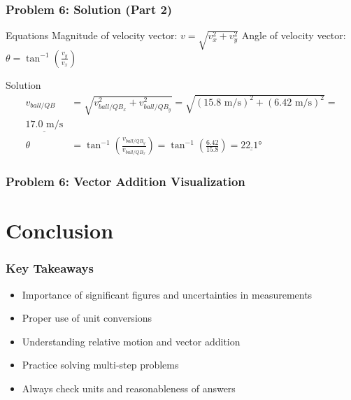 \documentclass{beamer}
\begin{document}
\begin{frame}
\frametitle{Problem 6: Solution (Part 2)}
\begin{block}{Equations}
Magnitude of velocity vector: $v = \sqrt{v_x^2 + v_y^2}$
Angle of velocity vector: $\theta = \tan^{-1}\left(\frac{v_y}{v_x}\right)$
\end{block}
\begin{block}{Solution}
\begin{align*}
v_{ball/QB} &= \sqrt{v_{ball/QB_x}^2 + v_{ball/QB_y}^2} = \sqrt{(15.8 \text{ m/s})^2 + (6.42 \text{ m/s})^2} = \\\underline{17.0 \text{ m/s}}\\
\theta &= \tan^{-1}\left(\frac{v_{ball/QB_y}}{v_{ball/QB_x}}\right) = \tan^{-1}\left(\frac{6.42}{15.8}\right) = \underline{22.1°}
\end{align*}
\end{block}
\end{frame}

\begin{frame}
\frametitle{Problem 6: Vector Addition Visualization}
\end{frame}

\section{Conclusion}

\begin{frame}
\frametitle{Key Takeaways}
\begin{itemize}
    \item Importance of significant figures and uncertainties in measurements
    \item Proper use of unit conversions
    \item Understanding relative motion and vector addition
    \item Practice solving multi-step problems
    \item Always check units and reasonableness of answers
\end{itemize}
\end{frame}
\end{document}
